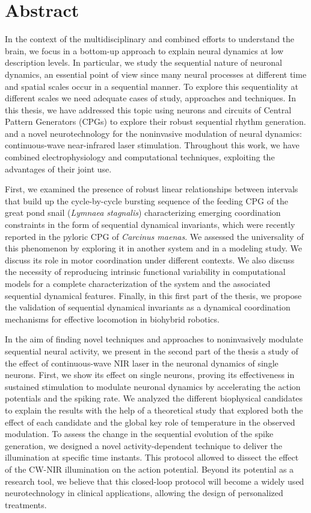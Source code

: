 \chapter*{Abstract}
In the context of the multidisciplinary and combined efforts to understand the brain, we focus in a bottom-up approach to explain neural dynamics at low description 
 levels. In particular, we study the sequential nature of neuronal dynamics, an essential point of view since many neural processes at different time and spatial scales occur in a sequential manner. To explore this sequentiality at different scales we need adequate cases of study, approaches and techniques. In this thesis, we have addressed this topic using neurons and circuits of Central Pattern Generators (CPGs) to explore their robust sequential rhythm generation. and a novel neurotechnology for the noninvasive modulation of neural dynamics: continuous-wave near-infrared laser stimulation. Throughout this work, we have combined electrophysiology and computational techniques, exploiting the advantages of their joint use. 

First, we examined the presence of robust linear relationships between intervals that build up the cycle-by-cycle bursting sequence of the feeding CPG of the great pond snail (\textit{Lymnaea stagnalis}) characterizing emerging coordination constraints in the form of sequential dynamical invariants, which were recently reported in the pyloric CPG of \textit{Carcinus maenas}. We assessed the universality of this phenomenon by exploring it in another system and in a modeling study. We discuss its role in motor coordination under different contexts. We also discuss the necessity of reproducing intrinsic functional variability in computational models for a complete characterization of the system and the associated sequential dynamical features. Finally, in this first part of the thesis, we propose the validation of sequential dynamical invariants as a dynamical coordination mechanisms for  effective locomotion in biohybrid robotics. 

In the aim of finding novel techniques and approaches to noninvasively modulate sequential neural activity, we present in the second part of the thesis a study of the effect of continuous-wave NIR laser in the neuronal dynamics of single neurons. First, we show its effect on single neurons, proving its effectiveness in sustained stimulation to modulate neuronal dynamics by accelerating the action potentials and the spiking rate. We analyzed the different biophysical candidates to explain the results with the help of a theoretical study that explored both the effect of each candidate and the global key role of temperature in the observed modulation. To assess the change in the sequential evolution of the spike generation, we designed a novel activity-dependent technique to deliver the illumination at specific time instants. This protocol allowed to dissect the effect of the CW-NIR illumination on the action potential. Beyond its potential as a research tool, we believe that this closed-loop protocol will become a widely used neurotechnology in clinical applications, allowing the design of personalized treatments. 

